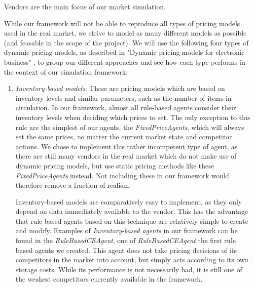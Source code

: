 Vendors are the main focus of our market simulation.

While our framework will not be able to reproduce all types of pricing models used in the real market, we strive to model as many different models as possible (and feasable in the scope of the project). We will use the following four types of dynamic pricing models, as described in "Dynamic pricing models for electronic business" \cite{dynamicPricingModels}, to group our different approaches and see how each type performs in the context of our simulation framework:

\begin{enumerate}
	\item \emph{Inventory-based models}: These are pricing models which are based on inventory levels and similar parameters, such as the number of items in circulation. In our framework, almost all rule-based agents consider their inventory levels when deciding which prices to set. The only exception to this rule are the simplest of our agents, the \emph{FixedPriceAgents}, which will always set the same prices, no matter the current market state and competitor actions. We chose to implement this rather incompetent type of agent, as there are still many vendors in the real market which do not make use of dynamic pricing models, but use static pricing methods like these \emph{FixedPriceAgents} instead. Not including these in our framework would therefore remove a fraction of realism.

	      Inventory-based models are comparatively easy to implement, as they only depend on data immediately available to the vendor. This has the advantage that rule based agents based on this technique are relatively simple to create and modify. Examples of \emph{Inventory-based agents} in our framework can be found in the \emph{RuleBasedCEAgent}, one of \emph{RuleBasedCEAgent} the first rule based agents we created. This agent does not take pricing decisions of its competitors in the market into account, but simply acts according to its own storage costs. While its performance is not necessarily bad, it is still one of the weakest competitors currently available in the framework. 


\end{enumerate}
